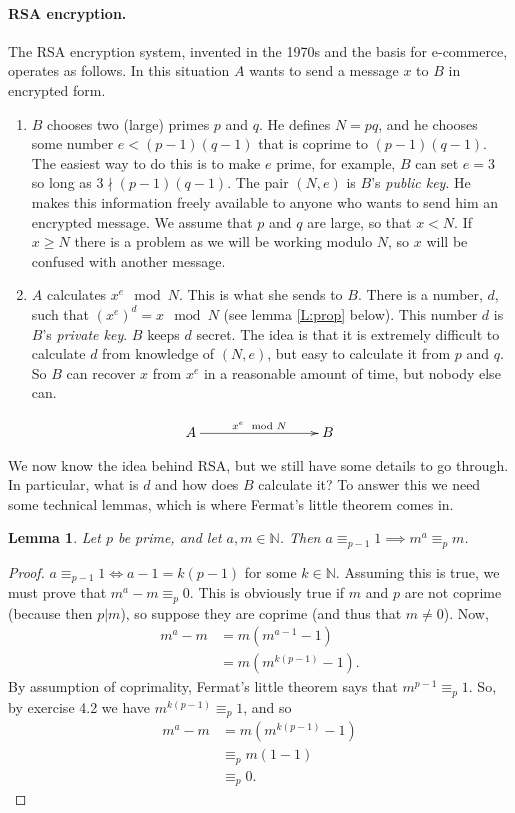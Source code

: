 \documentclass{article}
\theoremstyle{plain}
\newtheorem{lemma}[theorem]{Lemma}{\bfseries}{\upshape}
\newcommand{\bN}{\mathbb{N}}
\begin{document}
\paragraph{RSA encryption.}
The RSA encryption system, invented in the 1970s and the basis for e-commerce, operates as follows. In this situation $A$ wants to send a message $x$ to $B$ in encrypted form.
\begin{enumerate}
\item $B$ chooses two (large) primes $p$ and $q$. He defines $N = pq$, and he chooses some number $e<(p-1)(q-1)$ that is coprime to $(p-1)(q-1)$. The easiest way to do this is to make $e$ prime, for example, $B$ can set $e=3$ so long as $3\nmid (p-1)(q-1)$. The pair $(N,e)$ is $B$'s \emph{public key}. He makes this information freely available to anyone who wants to send him an encrypted message. We assume that $p$ and $q$ are large, so that $x< N$. If $x\geq N$ there is a problem as we will be working modulo $N$, so $x$ will be confused with another message.
\item $A$ calculates $x^e\mod N$. This is what she sends to $B$. There is a number, $d$, such that $(x^e)^d = x\mod N$ (see lemma \ref{L:prop} below). This number $d$ is $B$'s \emph{private key}. $B$ keeps $d$ secret. The idea is that it is extremely difficult to calculate $d$ from knowledge of $(N,e)$, but easy to calculate it from $p$ and $q$. So $B$ can recover $x$ from $x^e$ in a reasonable amount of time, but nobody else can. 
\end{enumerate}

\[\xymatrix{A\ar[rrr]^{x^e\mod N} & & & B}\]

We now know the idea behind RSA, but we still have some details to go through. In particular, what is $d$ and how does $B$ calculate it? To answer this we need some technical lemmas, which is where Fermat's little theorem comes in.
\begin{lemma}\label{L:ma}
Let $p$ be prime, and let $a,m\in\bN$. Then $a\equiv_{p-1} 1\implies m^a\equiv_p m$.
\end{lemma}
\begin{proof}
$a\equiv_{p-1} 1\iff a-1 = k(p-1)$ for some $k\in\bN$. Assuming this is true, we must prove that $m^a-m\equiv_p 0$. This is obviously true if $m$ and $p$ are not coprime (because then $p|m$), so suppose they are coprime (and thus that $m\neq 0 $). Now,
\begin{align*}
m^a-m &= m(m^{a-1}-1)\\
&=m(m^{k(p-1)} -1).
\end{align*}
By assumption of coprimality, Fermat's little theorem says that $m^{p-1}\equiv_p 1$. So, by exercise 4.2 we have $m^{k(p-1)}\equiv_p 1$, and so
\begin{align*}
m^a-m &=m(m^{k(p-1)} -1)\\
&\equiv_p m(1-1)\\
&\equiv_p 0.
\end{align*} 
\end{proof}
\end{document}
